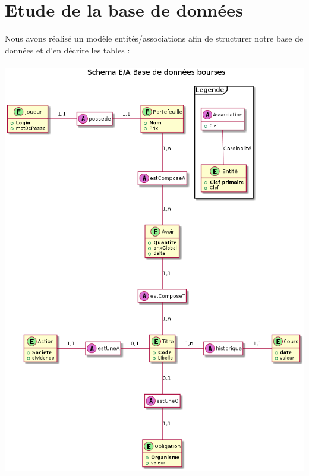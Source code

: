 \chapter{Etude de la base de données}

Nous avons réalisé un modèle entités/associations afin de structurer notre base de données et d'en décrire les tables : \\ \\
\includegraphics[scale=0.5]{../graph/DiagrammeEntiteAssociation.png} \\